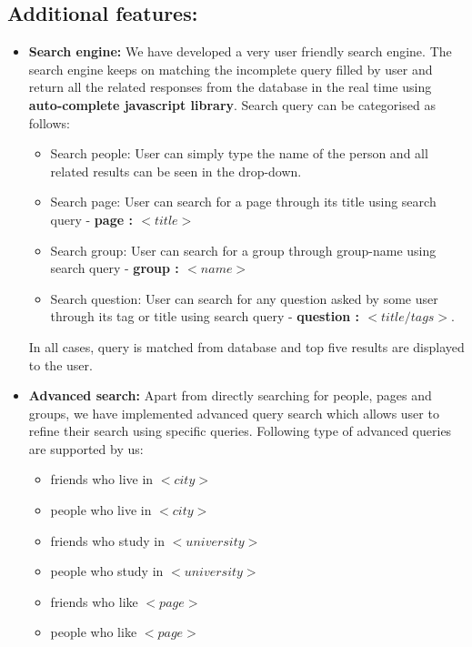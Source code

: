 \documentclass{article}
\begin{document}
\subsection{Additional features:}
\begin{itemize}
\item \textbf{Search engine:} We have developed a very user friendly search engine. The search engine keeps on matching the incomplete query filled by user and return all the related responses from the database in the real time using \textbf{auto-complete javascript library}\cite{autocomplete}. Search query can be categorised as follows:
\begin{itemize}
\item Search people: User can simply type the name of the person and all related results can be seen in the drop-down.
\item Search page: User can search for a page through its title using search query - \textbf{page : $<title>$}
\item Search group: User can search for a group through group-name using search query - \textbf{group : $<name>$}
\item Search question: User can search for any question asked by some user through its tag or title using search query - \textbf{question : $<title/tags>$}.
\end{itemize}
In all cases, query is matched from database and top five results are displayed to the user.

\item \textbf{Advanced search:} Apart from directly searching for people, pages and groups, we have implemented advanced query search which allows user to refine their search using specific queries. Following type of advanced queries are supported by us:
\begin{itemize}
\item friends who live in $<city>$
\item people who live in $<city>$ 
\item friends who study in $<university>$
\item people who study in $<university>$
\item friends who like $<page>$ 
\item people who like $<page>$
\end{itemize}
\end{itemize}
\end{document}
